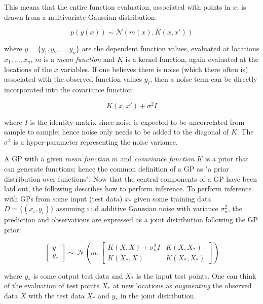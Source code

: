 This means that the entire function evaluation, associated with points in $x$, is drawn from a multivariate Gaussian distribution:

\begin{equation}
p(y(x)) \sim \mathcal{N}(m(x), K(x, x'))
\end{equation}

where $y = \{y_1, y_2,. . .,y_n\}$ are the dependent function values, evaluated at locations $x_1,. . .,x_n$, $m$ is a \textit{mean function} and $K$ is a kernel function, again evaluated at the locations of the $x$ variables. If one believes there is noise (which there often is) associated with the observed function values $y_i$, then a noise term can be directly incorporated into the covariance function:

\begin{equation}
K(x, x') + \sigma^2I
\end{equation}

where $I$ is the identity matrix since noise is expected to be uncorrelated from sample to sample; hence noise only needs to be added to the diagonal of $K$. The $\sigma^2$ is a hyper-parameter representing the noise variance.

A GP with a given \textit{mean function} $m$ and \textit{covariance function} $K$ is a prior that can generate functions; hence the common definition of a GP as "a prior distribution over functions". Now that the central components of a GP have been laid out, the following describes how to perform inference. To perform inference with GPs from some input (test data) $x_*$ given some training data $D = \{(x_i, y_i)\}$ assuming i.i.d additive Gaussian noise with variance $\sigma_{n}^2$, the prediction and observations are expressed as a joint distribution following the GP prior:

\begin{equation}
\begin{bmatrix} 
y \\ 
y_*
\end{bmatrix} 
\sim{~} \mathcal{N} (m, \begin{bmatrix} 
K(X, X) + \sigma_{n}^2I & K(X, X_*) \\
K(X_*, X) & K(X_*, X_*)
\end{bmatrix})
\end{equation}

where $y_*$ is some output test data and $X_*$ is the input test points. One can think of the evaluation of test points $X_*$ at new locations as \textit{augmenting} the observed data $X$ with the test data $X_*$ and $y_*$ in the joint distribution. 

